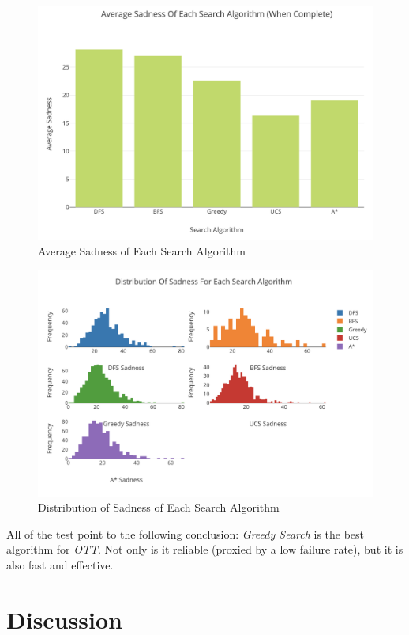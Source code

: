 \documentclass[11pt]{article}
\begin{document}
\begin{figure}[!h]
\centering
\includegraphics[width=\textwidth]{sad_bar.png}
\caption{Average Sadness of Each Search Algorithm}
\end{figure}

\begin{figure}[!h]
\centering
\includegraphics[width=\textwidth]{sad_hist.png}
\caption{Distribution of Sadness of Each Search Algorithm}
\end{figure}

All of the test point to the following conclusion: \textit{Greedy Search} is the best algorithm for \textit{OTT}. Not only is it reliable (proxied by a low failure rate), but it is also fast and effective.


\section{Discussion}
\end{document}
